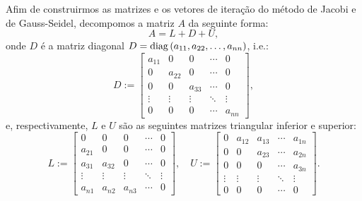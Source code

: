 Afim de construirmos as matrizes e os vetores de iteração do método de Jacobi e de Gauss-Seidel, decompomos a matriz $A$ da seguinte forma:
\begin{equation*}
  A = L + D + U,
\end{equation*}
onde $D$ é a matriz diagonal $D = \operatorname{diag}\,(a_{11}, a_{22}, \ldots, a_{nn})$, i.e.:
\begin{equation*}
  D := \begin{bmatrix}
    a_{11} & 0 & 0 & \cdots & 0\\
    0 & a_{22} & 0 & \cdots & 0\\
    0 & 0 & a_{33} & \cdots & 0\\
    \vdots & \vdots & \vdots & \ddots & \vdots\\
    0 & 0 & 0 & \cdots & a_{nn}
  \end{bmatrix},
\end{equation*}
e, respectivamente, $L$ e $U$ são as seguintes matrizes triangular inferior e superior:
\begin{equation*}
  L := \begin{bmatrix}
    0 & 0 & 0 & \cdots & 0\\
    a_{21} & 0 & 0 & \cdots & 0\\
    a_{31} & a_{32} & 0 &\cdots & 0\\
    \vdots & \vdots & \vdots & \ddots & \vdots\\
    a_{n1} & a_{n2} & a_{n3} & \cdots & 0
  \end{bmatrix},\quad
  U := \begin{bmatrix}
    0 & a_{12} & a_{13} & \cdots & a_{1n}\\
    0 & 0 & a_{23} & \cdots & a_{2n}\\
    0 & 0 & 0 & \cdots & a_{3n}\\
    \vdots & \vdots & \vdots & \ddots & \vdots\\
    0 & 0 & 0 & \cdots & 0
  \end{bmatrix}.
\end{equation*}

